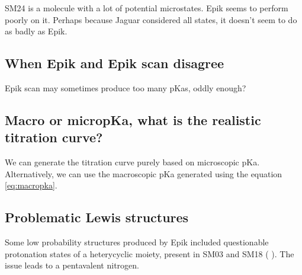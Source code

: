 \documentclass[9pt,lineno,final]{elife}
\begin{document}
SM24 is a molecule with a lot of potential microstates. Epik seems to perform poorly on it. Perhaps because Jaguar considered all states, it doesn't seem to do as badly as Epik.

\subsection{When Epik and Epik scan disagree}
Epik scan may sometimes produce too many pKas, oddly enough?

\subsection{Macro or micropKa, what is the realistic titration curve?}
We can generate the titration curve purely based on microscopic pKa. Alternatively,
we can use the macroscopic pKa generated using the equation \cref{eq:macropka}.

\subsection{Problematic Lewis structures}

Some low probability structures produced by Epik included questionable protonation states of a heterycyclic moiety, present in SM03 and SM18 ( ).  The issue leads to a pentavalent nitrogen.
\end{document}
